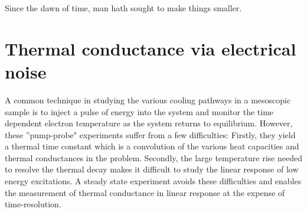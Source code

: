 \begin{savequote}[75mm]
Since the dawn of time, man hath sought to make things smaller.
\end{savequote}

\chapter{Thermal conductance via electrical noise}
\label{ch:thermal_conductance_via_electrical_noise}
A common technique in studying the various cooling pathways in a mesoscopic sample is to inject a pulse of energy into the system and monitor the time dependent electron temperature as the system returns to equilibrium. However, these ''pump-probe" experiments suffer from a few difficulties: Firstly, they yield a thermal time constant which is a convolution of the various heat capacities and thermal conductances in the problem. Secondly, the large temperature rise needed to resolve the thermal decay makes it difficult to study the linear response of low energy excitations. A steady state experiment avoids these difficulties and enables the measurement of thermal conductance in linear response at the expense of time-resolution.

